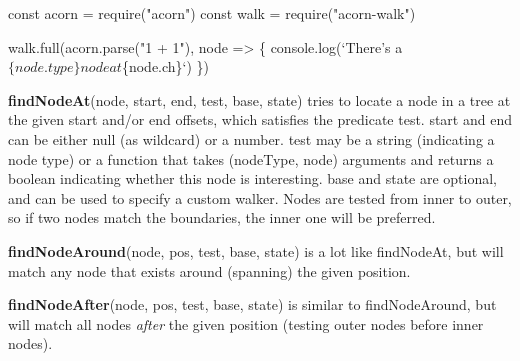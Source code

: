 \begin{DoxyCode}
const acorn = require("acorn")
const walk = require("acorn-walk")

walk.full(acorn.parse("1 + 1"), node => \{
  console.log(`There's a $\{node.type\} node at $\{node.ch\}`)
\})
\end{DoxyCode}


{\bfseries find\+Node\+At}{\ttfamily (node, start, end, test, base, state)} tries to locate a node in a tree at the given start and/or end offsets, which satisfies the predicate {\ttfamily test}. {\ttfamily start} and {\ttfamily end} can be either {\ttfamily null} (as wildcard) or a number. {\ttfamily test} may be a string (indicating a node type) or a function that takes {\ttfamily (node\+Type, node)} arguments and returns a boolean indicating whether this node is interesting. {\ttfamily base} and {\ttfamily state} are optional, and can be used to specify a custom walker. Nodes are tested from inner to outer, so if two nodes match the boundaries, the inner one will be preferred.

{\bfseries find\+Node\+Around}{\ttfamily (node, pos, test, base, state)} is a lot like {\ttfamily find\+Node\+At}, but will match any node that exists \textquotesingle{}around\textquotesingle{} (spanning) the given position.

{\bfseries find\+Node\+After}{\ttfamily (node, pos, test, base, state)} is similar to {\ttfamily find\+Node\+Around}, but will match all nodes {\itshape after} the given position (testing outer nodes before inner nodes). 